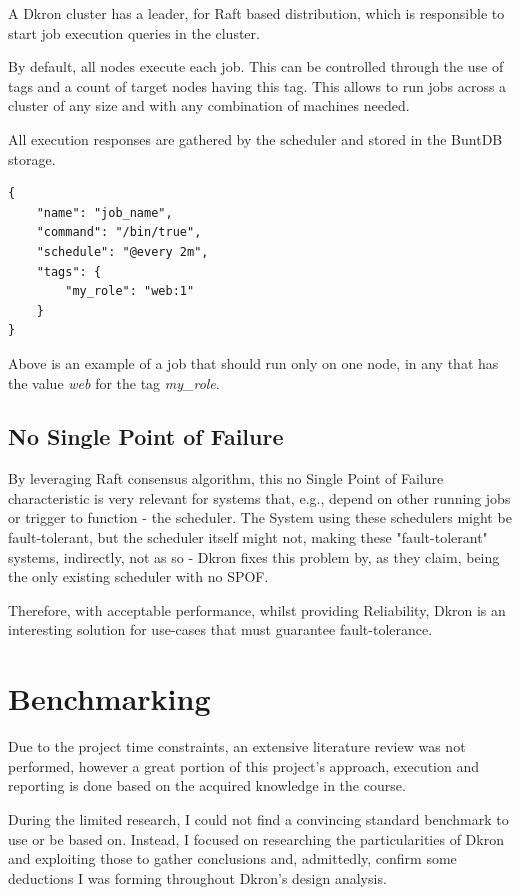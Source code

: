 \documentclass[runningheads]{llncs}
\begin{document}
A Dkron cluster has a leader, for Raft based distribution, which is responsible to start job execution queries in the cluster.

By default, all nodes execute each job. This can be controlled through the use of tags and
a count of target nodes having this tag. This allows to run jobs across a cluster of any size and with any
combination of machines needed.

All execution responses are gathered by the scheduler and stored in the BuntDB storage.

\begin{verbatim}
{
    "name": "job_name",
    "command": "/bin/true",
    "schedule": "@every 2m",
    "tags": {
        "my_role": "web:1"
    }
}
\end{verbatim}

Above is an example of a job that should run only on one node, in any that has the value \textit{web}
for the tag \textit{my\_role}.


\subsection{No Single Point of Failure}
By leveraging Raft consensus algorithm, this no Single Point of Failure characteristic is very relevant for systems
that, e.g., depend on other running jobs or trigger to function - the scheduler.
The System using these schedulers might be fault-tolerant, but the scheduler itself might not, making these "fault-tolerant" systems, indirectly, not as
so - Dkron fixes this problem by, as they claim, being the only existing scheduler with no SPOF.

Therefore, with acceptable performance, whilst providing Reliability, Dkron is an interesting solution
for use-cases that must guarantee fault-tolerance.

\section{Benchmarking}

Due to the project time constraints, an extensive literature review was not performed, however
a great portion of this project's approach, execution and reporting is done based on the acquired
knowledge in the course.

During the limited research, I could not find a convincing standard benchmark to use or be based on.
Instead, I focused on researching the particularities of Dkron and exploiting those to gather conclusions and,
admittedly, confirm some deductions I was forming throughout Dkron's design analysis.
\end{document}
